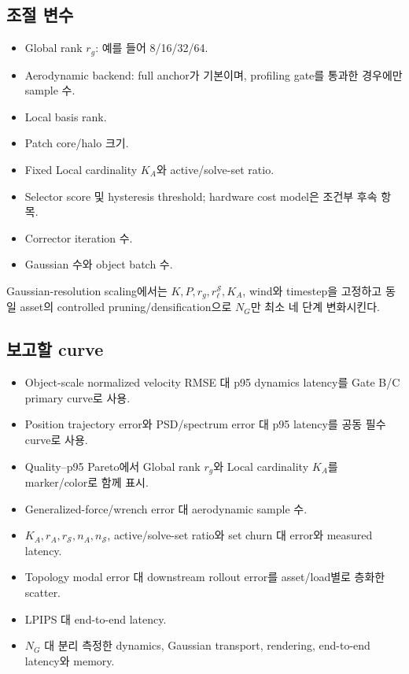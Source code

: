 \documentclass[11pt,a4paper]{article}
\begin{document}
\subsection*{조절 변수}

\begin{itemize}[leftmargin=1.5em]
  \item Global rank \(r_g\): 예를 들어 8/16/32/64.
  \item Aerodynamic backend: full anchor가 기본이며, profiling gate를 통과한 경우에만 sample 수.
  \item Local basis rank.
  \item Patch core/halo 크기.
  \item Fixed Local cardinality \(K_A\)와 active/solve-set ratio.
  \item Selector score 및 hysteresis threshold; hardware cost model은 조건부 후속 항목.
  \item Corrector iteration 수.
  \item Gaussian 수와 object batch 수.
\end{itemize}

Gaussian-resolution scaling에서는 \(K,P,r_g,r_\ell^{\mathcal S},K_A\), wind와 timestep을 고정하고
동일 asset의 controlled pruning/densification으로 \(N_G\)만 최소 네 단계 변화시킨다.

\subsection*{보고할 curve}

\begin{itemize}[leftmargin=1.5em]
  \item Object-scale normalized velocity RMSE 대 p95 dynamics latency를 Gate B/C primary curve로 사용.
  \item Position trajectory error와 PSD/spectrum error 대 p95 latency를 공동 필수 curve로 사용.
  \item Quality--p95 Pareto에서 Global rank \(r_g\)와 Local cardinality \(K_A\)를 marker/color로 함께 표시.
  \item Generalized-force/wrench error 대 aerodynamic sample 수.
  \item \(K_A,r_A,r_{\mathcal S},n_A,n_{\mathcal S}\), active/solve-set ratio와
  set churn 대 error와 measured latency.
  \item Topology modal error 대 downstream rollout error를 asset/load별로 층화한 scatter.
  \item LPIPS 대 end-to-end latency.
  \item \(N_G\) 대 분리 측정한 dynamics, Gaussian transport, rendering, end-to-end latency와 memory.
\end{itemize}
\end{document}
